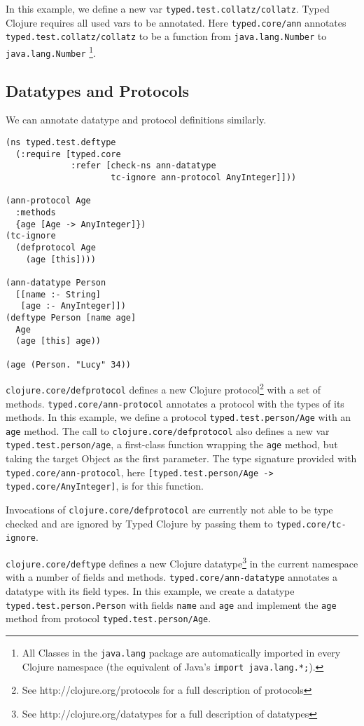 In this example, we define a new var \lstinline|typed.test.collatz/collatz|. Typed Clojure requires all 
used vars to be annotated. Here \lstinline|typed.core/ann| annotates \lstinline|typed.test.collatz/collatz|
to be a function from \lstinline{java.lang.Number} to 
\lstinline{java.lang.Number}
\footnote{All Classes in the \lstinline|java.lang| package
are automatically imported in every Clojure namespace (the equivalent of Java's \lstinline|import java.lang.*;|).}.

\subsection{Datatypes and Protocols}

We can annotate datatype and protocol definitions similarly.

\begin{lstlisting}
(ns typed.test.deftype
  (:require [typed.core 
             :refer [check-ns ann-datatype
                     tc-ignore ann-protocol AnyInteger]]))

(ann-protocol Age 
  :methods
  {age [Age -> AnyInteger]})
(tc-ignore
  (defprotocol Age
    (age [this])))

(ann-datatype Person 
  [[name :- String]
   [age :- AnyInteger]])
(deftype Person [name age]
  Age
  (age [this] age))

(age (Person. "Lucy" 34))
\end{lstlisting}

\lstinline|clojure.core/defprotocol| defines a new Clojure protocol\footnote{See http://clojure.org/protocols for a full description of protocols}
with a set of methods. \lstinline|typed.core/ann-protocol| annotates a protocol with the types of its methods.
In this example, we define a protocol \lstinline|typed.test.person/Age| with an \lstinline|age| method.
The call to \lstinline|clojure.core/defprotocol| also defines a new var \lstinline|typed.test.person/age|, a first-class function
wrapping the \lstinline|age| method, but taking the target Object as the first parameter. The
type signature provided with \lstinline|typed.core/ann-protocol|, here \lstinline|[typed.test.person/Age -> typed.core/AnyInteger]|, 
is for this function.

Invocations of \lstinline|clojure.core/defprotocol| are currently not able to be type checked
and are ignored by Typed Clojure by passing them to \lstinline|typed.core/tc-ignore|.

\lstinline|clojure.core/deftype|
defines a new Clojure datatype\footnote{See http://clojure.org/datatypes for a full description of datatypes}
in the current namespace with a number of fields and methods. 
\lstinline|typed.core/ann-datatype| annotates a datatype with its field types.
In this example, we create a datatype \lstinline|typed.test.person.Person|
with fields \lstinline|name| and \lstinline|age| and implement the \lstinline|age|
method from protocol \lstinline|typed.test.person/Age|.

